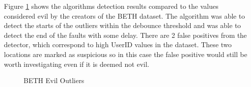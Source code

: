 Figure \ref{fig:beth_evil_outliers} shows the algorithms detection results compared to the values considered evil by the creators of the BETH dataset. The algorithm was able to detect the starts of the outliers within the debounce threshold and was able to detect the end of the faults with some delay. There are 2 false positives from the detector, which correspond to high UserID values in the dataset. These two locations are marked as suspicious so in this case the false positive would still be worth investigating even if it is deemed not evil.
 
\begin{figure}[H]
    \centering
    
    \caption{BETH Evil Outliers}
    \label{fig:beth_evil_outliers}
\end{figure}

